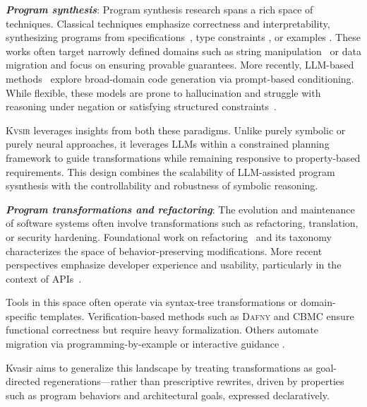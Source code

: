 \documentclass[noacm,sigplan]{acmart}
\newcommand{\sys}{{\scshape Kv{\textalpha}sir}\xspace}
\newcommand{\heading}[1]{\vspace{2pt}\noindent\textbf{\emph{#1}}:\enspace}
\begin{document}
\heading{Program synthesis}
Program synthesis research spans a rich space of techniques.
Classical techniques emphasize correctness and
interpretability, synthesizing programs from specifications~\cite{alur2013syntax, feser2015synthesizing, gulwani2011automating},
type constraints \cite{polikarpova2016program},
or examples \cite{jha2010oracle, raza2018disjunctive, singh2016blinkfill}.
These works often target narrowly
defined domains such as string manipulation~\cite{harp:ccs:2021} or data migration
\cite{yaghmazadeh2018automated} and focus on ensuring provable guarantees.
More recently, LLM-based methods~\cite{austin2021program, chen2021evaluating}
explore broad-domain code generation via prompt-based conditioning.
While flexible, these models are prone to hallucination and struggle
with reasoning under negation or satisfying structured constraints~\cite{xu2023llmfoolitselfpromptbased, wu2023deceptpromptexploitingllmdrivencode,jiang2024llmsdreamelephantswhen,hwang2024thinkpinkelephant}.

\sys leverages insights from both these paradigms.
Unlike purely symbolic or purely neural approaches, it leverages LLMs within a
constrained planning framework to guide transformations while remaining
responsive to property-based requirements.
This design combines
the scalability of LLM-assisted program sysnthesis with the controllability and robustness of symbolic
reasoning. %

\heading{Program transformations and refactoring}
The evolution and maintenance of software systems often involve transformations
such as refactoring, translation, or security hardening. Foundational work on
refactoring~\cite{Fowler99} and its taxonomy~\cite{Mens04} characterizes the
space of behavior-preserving modifications. More recent perspectives emphasize
developer experience and usability, particularly in the context of APIs~\cite{Myers16}.

Tools in this space often operate via syntax-tree transformations or
domain-specific templates. Verification-based methods such as \textsc{Dafny}
\cite{Leino10} and \textsc{CBMC} \cite{Clarke04} ensure functional correctness
but require heavy formalization.
Others automate migration via
programming-by-example or interactive guidance \cite{gulwani2017program, le2017interactive}.

Kvasir aims to generalize this landscape by treating transformations as
goal-directed regenerations---rather than prescriptive rewrites, driven by
properties such as program behaviors and architectural goals, expressed declaratively.
\end{document}
